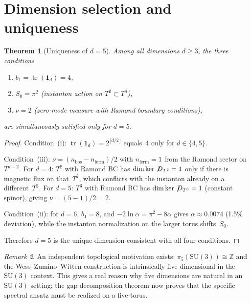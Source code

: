 \documentclass[11pt,a4paper]{article}
\newtheorem{theorem}{Theorem}
\theoremstyle{definition}
\theoremstyle{remark}
\newtheorem{remark}[theorem]{Remark}
\begin{document}
\section{Dimension selection and uniqueness}
\label{sec:uniqueness}

\begin{theorem}[Uniqueness of $d=5$]\label{thm:d5}
Among all dimensions $d\geq 3$, the three conditions
\begin{enumerate}[label=\textup{(\roman*)}]
\item $b_1=\operatorname{tr}(\mathbf{1}_d)=4$,
\item $S_0=\pi^2$ (instanton action on $T^2\subset T^d$),
\item $\nu=2$ (zero-mode measure with Ramond boundary conditions),
\end{enumerate}
are simultaneously satisfied only for $d=5$.
\end{theorem}

\begin{proof}
Condition~(i): $\operatorname{tr}(\mathbf{1}_d)=2^{\lfloor d/2\rfloor}$
equals~4 only for $d\in\{4,5\}$.

Condition~(iii): $\nu=(n_{\mathrm{bos}}-n_{\mathrm{ferm}})/2$ with
$n_{\mathrm{ferm}}=1$ from the Ramond sector on $T^{d-2}$.  For
$d=4$: $T^2$ with Ramond BC has $\dim\ker\not\!D_{T^2}=1$ only if
there is magnetic flux on that~$T^2$, which conflicts with the instanton
already on a different~$T^2$.  For $d=5$: $T^3$ with Ramond BC has
$\dim\ker\not\!D_{T^3}=1$ (constant spinor), giving $\nu=(5-1)/2=2$.

Condition~(ii): for $d=6$, $b_1=8$, and $-2\ln\alpha=\pi^2-8\alpha$
gives $\alpha\approx 0.0074$ (1.5\% deviation), while the instanton
normalization on the larger torus shifts~$S_0$.

Therefore $d=5$ is the unique dimension consistent with all four conditions.
\end{proof}

\begin{remark}
An independent topological motivation exists: $\pi_5(\mathrm{SU}(3))\cong\mathbb{Z}$
and the Wess--Zumino--Witten construction is intrinsically five-dimensional in the
$\mathrm{SU}(3)$ context.  This gives a real reason why five dimensions are
natural in an $\mathrm{SU}(3)$ setting; the gap decomposition theorem now proves that the
specific spectral ansatz must be realized on a five-torus.
\end{remark}
\end{document}
